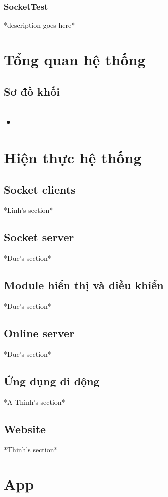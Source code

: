 \documentclass[12pt,titlepage,a4paper]{article}
\begin{document}
\subsubsection{SocketTest}
*description goes here*

\newpage
\section{Tổng quan hệ thống}
\subsection{Sơ đồ khối}
\subsection{•}

\newpage
\section{Hiện thực hệ thống}
\subsection{Socket clients}
*Linh's section*
\subsection{Socket server}
*Duc's section*
\subsection{Module hiển thị và điều khiển}
*Duc's section*
\subsection{Online server}
*Duc's section*
\subsection{Ứng dụng di động}
*A Thinh's section*
\subsection{Website}
*Thinh's section*

\newpage
\section{App}
\end{document}

